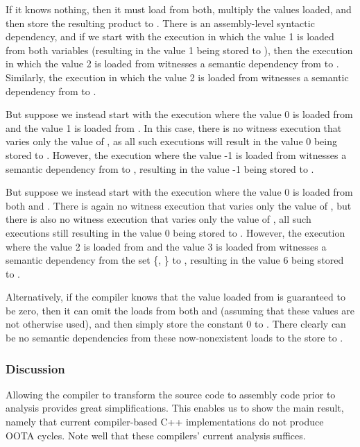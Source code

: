 If it knows nothing, then it must load from both, multiply the values
loaded, and then store the resulting product to .
There is an assembly-level syntactic dependency, and if we start
with the execution in which the value 1 is loaded from both variables
(resulting in the value 1 being stored to ),
then the execution in which the value 2 is loaded from  witnesses
a semantic dependency from  to .
Similarly, the execution in which the value 2 is loaded from 
witnesses a semantic dependency from  to .

But suppose we instead start with the execution where the value 0
is loaded from  and the value 1 is loaded from .
In this case, there is no witness execution that varies only the value
of , as all such executions will result in the value 0 being stored
to .
However, the execution where the value -1 is loaded from 
witnesses a semantic dependency from  to , resulting in
the value -1 being stored to .

But suppose we instead start with the execution where the value 0
is loaded from both  and .
There is again no witness execution that varies only the value of ,
but there is also no witness execution that varies only the value of ,
all such executions still resulting in the value 0 being stored to .
However, the execution where the value 2 is loaded from  and the
value 3 is loaded from  witnesses a semantic dependency from the
set \{, \} to , resulting in the value 6 being stored
to .

Alternatively, if the compiler knows that the value loaded from 
is guaranteed to be zero, then it can omit the loads from both 
and  (assuming that these values are not otherwise used), and
then simply store the constant 0 to .
There clearly can be no semantic dependencies from these now-nonexistent
loads to the store to .

\subsubsection{Discussion}
\label{sec:Discussion}

Allowing the compiler to transform the source code to assembly code
prior to analysis provides great simplifications.
This enables us to show the main result, namely that current compiler-based
C++ implementations do not produce OOTA cycles.
Note well that these compilers' current analysis suffices.

